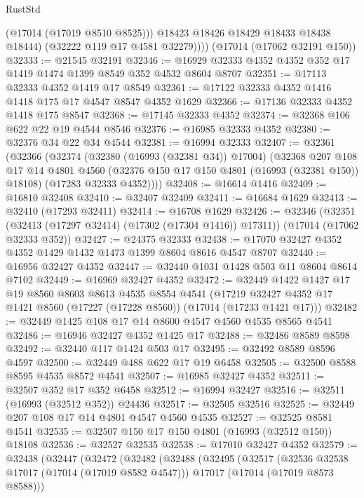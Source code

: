 \begin{lexlean}{RustStd}
\begin{coremodule}
{\begin{coremodule}
{{{{{{{{{{{{{{{{{{{{{{{{{{{{{{{{{{{{{{{{{{{{{{{{{{{{{{{              (@17014 (@17019 @8510 @8525)))
            @18423
            @18426
            @18429
            @18433
            @18438
            @18444)
          (@32222 @119 @17 @4581 @32279))))
    (@17014 (@17062 @32191 @150))
@32333 := @21545 @32191
@32346 := @16929 @32333 @4352 @4352 @352 @17 @1419 @1474 @1399 @8549 @352 @4532 @8604 @8707
@32351 := @17113 @32333 @4352 @1419 @17 @8549
@32361 := @17122 @32333 @4352 @1416 @1418 @175 @17 @4547 @8547 @4352 @1629
@32366 := @17136 @32333 @4352 @1418 @175 @8547
@32368 := @17145 @32333 @4352
@32374 := @32368 @106 @622 @22 @19 @4544 @8546
@32376 := @16985 @32333 @4352
@32380 := @32376 @34 @22 @34 @4544
@32381 := @16994 @32333
@32407 := @32361
    (@32366
      (@32374
        (@32380 (@16993 (@32381 @34)) @17004)
        (@32368
          @207
          @108
          @17
          @14
          @4801
          @4560
          (@32376 @150 @17 @150 @4801 (@16993 (@32381 @150)) @18108)
          (@17283 @32333 @4352))))
@32408 := @16614 @1416
@32409 := @16810 @32408
@32410 := @32407 @32409
@32411 := @16684 @1629
@32413 := @32410 (@17293 @32411)
@32414 := @16708 @1629
@32426 := @32346
    (@32351 (@32413 (@17297 @32414) (@17302 (@17304 @1416)) @17311))
    (@17014 (@17062 @32333 @352))
@32427 := @24375 @32333
@32438 := @17070 @32427 @4352 @4352 @1429 @1432 @1473 @1399 @8604 @8616 @4547 @8707
@32440 := @16956 @32427 @4352
@32447 := @32440 @1031 @1428 @503 @11 @8604 @8614 @7102
@32449 := @16969 @32427 @4352
@32472 := @32449
    @1422
    @1427
    @17
    @19
    @8560
    @8603
    @8613
    @4535
    @8554
    @4541
    (@17219 @32427 @4352 @17 @1421 @8560 (@17227 (@17228 @8560)) (@17014 (@17233 @1421 @17)))
@32482 := @32449 @1425 @108 @17 @14 @8600 @4547 @4560 @4535 @8565 @4541
@32486 := @16946 @32427 @4352 @1425 @17
@32488 := @32486 @8589 @8598
@32492 := @32440 @117 @1424 @503 @17
@32495 := @32492 @8589 @8596 @4597
@32500 := @32449 @488 @622 @17 @19 @6458
@32505 := @32500 @8588 @8595 @4535 @8572 @4541
@32507 := @16985 @32427 @4352
@32511 := @32507 @352 @17 @352 @6458
@32512 := @16994 @32427
@32516 := @32511 (@16993 (@32512 @352)) @24436
@32517 := @32505 @32516
@32525 := @32449 @207 @108 @17 @14 @4801 @4547 @4560 @4535
@32527 := @32525 @8581 @4541
@32535 := @32507 @150 @17 @150 @4801 (@16993 (@32512 @150)) @18108
@32536 := @32527 @32535
@32538 := @17010 @32427 @4352
@32579 := @32438
    (@32447
      (@32472
        (@32482
          (@32488
            (@32495
              (@32517
                (@32536 @32538 @17017 (@17014 (@17019 @8582 @4547)))
                @17017
                (@17014 (@17019 @8573 @8588)))
}}}}}}}}}}}}}}}}}}}}}}}}}}}}}}}}}}}}}}}}}}}}}}}}}}}}}}}
\end{coremodule}}
\end{coremodule}
\end{lexlean}
